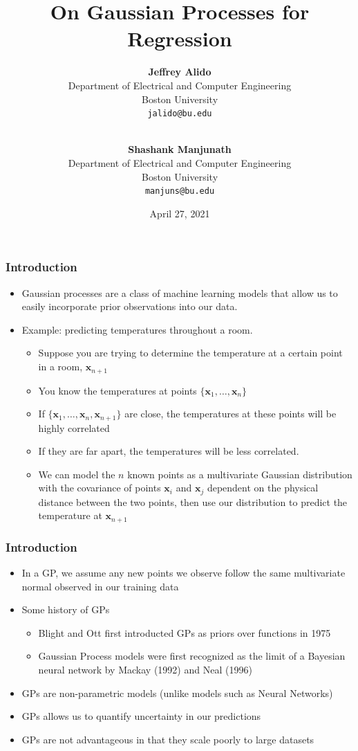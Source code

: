 \documentclass[pdf]{beamer}
\title{On Gaussian Processes for Regression}
\author{
  \textbf{Jeffrey Alido} \\
  Department of Electrical and Computer Engineering \\
  Boston University \\
  \texttt{jalido@bu.edu} \\
  \and \\
  \textbf{Shashank Manjunath} \\
  Department of Electrical and Computer Engineering \\
  Boston University \\
  \texttt{manjuns@bu.edu}
}
\date{April 27, 2021}
\newcommand{\bx}{\boldsymbol{x}}
\begin{document}
\begin{frame}
  \titlepage
\end{frame}

\begin{frame}
  \frametitle{Introduction}

  \begin{itemize}
    \item Gaussian processes are a class of machine learning models that allow us to easily incorporate prior
      observations into our data. 
    \item Example: predicting temperatures throughout a room.
    \begin{itemize}
      \item Suppose you are trying to determine the temperature at a certain point in a room, $\bx_{n+1}$
      \item You know the temperatures at points $\{\bx_1, \hdots, \bx_n\}$
      \item If $\{\bx_1, \hdots, \bx_n, \bx_{n+1}\}$ are close, the temperatures at these points will be highly
        correlated
      \item If they are far apart, the temperatures will be less correlated.
      \item We can model the $n$ known points as a multivariate Gaussian distribution with the covariance of points
        $\bx_i$ and $\bx_j$ dependent on the physical distance between the two points, then use our distribution to
        predict the temperature at $\bx_{n+1}$
    \end{itemize}
  \end{itemize}
\end{frame}

\begin{frame}
  \frametitle{Introduction}
  \begin{itemize}
    \item In a GP, we assume any new points we observe follow the same multivariate normal observed in our training data
    \item Some history of GPs 
    	\cite{rasmussen_gaussian_2006}
    \begin{itemize}
      \item Blight and Ott first introducted GPs as priors over functions in 1975
      \item Gaussian Process models were first recognized as the limit of a Bayesian neural network by Mackay (1992) and
        Neal (1996)
    \end{itemize}
    \item GPs are non-parametric models (unlike models such as Neural Networks)
    \item GPs allows us to quantify uncertainty in our predictions
    \item GPs are not advantageous in that they scale poorly to large datasets
  \end{itemize}
\end{frame}
\end{document}
